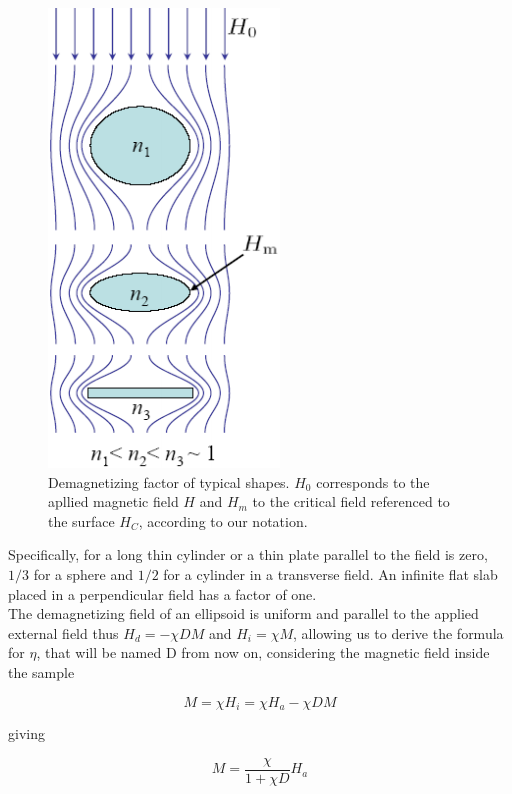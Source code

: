 \documentclass[openany,11pt,a4paper]{report}
\begin{document}
\begin{figure}[hbtp]
\centering
\includegraphics[scale=.8]{demagsha.PNG}
\caption{Demagnetizing factor of typical shapes. $H_{0}$ corresponds to the apllied magnetic field $H$ and $H_{m}$ to the critical field referenced to the surface $H_{C}$, according to our notation. \cite{demag}}
\label{diamshap}
\end{figure}



Specifically, for a long thin cylinder or a thin plate parallel to the field is zero, $1/3$ for a sphere and $1/2$  for a cylinder in a transverse field. An infinite flat slab placed in a perpendicular field has a factor of one.\\

The demagnetizing field of an ellipsoid is uniform and parallel to the applied external field thus $H_{d}=-\chi DM$ and $H_{i}=\chi M$, allowing us to derive the formula for $\eta$, that will be named D from now on, considering the magnetic field inside the sample

\begin{equation}
M=\chi H_{i} =\chi H_{a}- \chi D M
\end{equation}

giving  


\begin{equation}
M= \dfrac{\chi}{1+\chi D} H_{a}
\end{equation}
\end{document}
